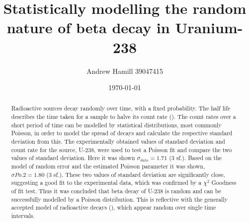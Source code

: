 \documentclass[11pt]{article}
\begin{document}
    \title{Statistically modelling the random nature of beta decay in Uranium-238}
    \author{Andrew Hamill 39047415}
    \date{\today}
    \maketitle

    \begin{abstract}
    \normalsize Radioactive sources decay randomly over time, with a fixed probability. The half life describes the time taken for a sample to halve its count rate (\cite{YF}). The count rates over a short period of time can be modelled by statistical distributions, most commonly Poisson, in order to model the spread of decays and calculate the respective standard deviation from this. The experimentally obtained values of standard deviation and count rate for the source, U-238, were used to test a Poisson fit and compare the two values of standard deviation. Here it was shown $\sigma_{data} = 1.71$ (3 sf.). Based on the model of random error and the estimated Poisson parameter it was shown, $\sigma{Po.2} = 1.80$ (3 sf.). These two values of standard deviation are significantly close, suggesting a good fit to the experimental data, which was confirmed by a $\chi^{2}$ Goodness of fit test. Thus it was concluded that beta decay of U-238 is random and can be successfully modelled by a Poisson distribution. This is reflective with the generally accepted model of radioactive decays (\cite{YF}), which appear random over single time intervals.  
    \end{abstract}
\end{document}
